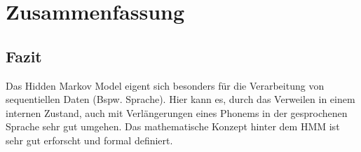 \chapter{Zusammenfassung}  \label{mainsec:result}

\section{Fazit}
Das Hidden Markov Model eigent sich besonders für die Verarbeitung von sequentiellen Daten (Bspw. Sprache). Hier kann es, durch das Verweilen in einem internen Zustand, auch mit Verlängerungen eines Phonems in der gesprochenen Sprache sehr gut umgehen. Das mathematische Konzept hinter dem HMM ist sehr gut erforscht und formal definiert.

